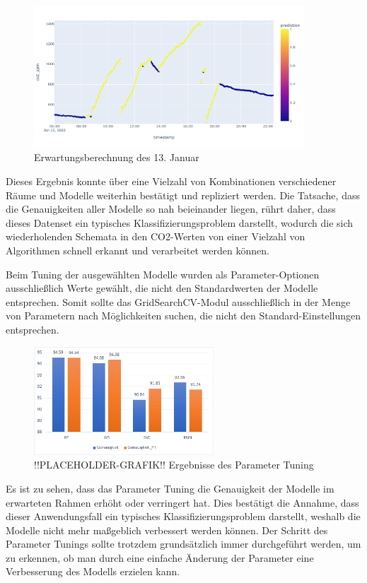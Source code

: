 \begin{figure}[h]
    \centering
    \includegraphics[width=0.9\textwidth]{pic/nov23_predicted.png}
    \caption{Erwartungsberechnung des 13. Januar}
    \label{fig:nov23_pred}
\end{figure}

Dieses Ergebnis konnte über eine Vielzahl von Kombinationen verschiedener Räume und Modelle weiterhin
bestätigt und repliziert werden. 
\newpage
Die Tatsache, dass die Genauigkeiten aller Modelle so nah beieinander 
liegen, rührt daher, dass dieses Datenset ein typisches Klassifizierungsproblem darstellt,
wodurch die sich wiederholenden Schemata in den CO2-Werten von einer Vielzahl von Algorithmen schnell 
erkannt und verarbeitet werden können.

Beim Tuning der ausgewählten Modelle wurden als Parameter-Optionen ausschließlich Werte gewählt, die nicht 
den Standardwerten der Modelle entsprechen. Somit sollte das GridSearchCV-Modul ausschließlich in der Menge 
von Parametern nach Möglichkeiten suchen, die nicht den Standard-Einstellungen entsprechen.

\begin{figure}[h]
    \centering
    \includegraphics[width=0.6\textwidth]{pic/param_eval.png}
    \caption{!!PLACEHOLDER-GRAFIK!! Ergebnisse des Parameter Tuning}
    \label{fig:PT_eval}
\end{figure}

Es ist zu sehen, dass das Parameter Tuning die Genauigkeit der Modelle im erwarteten Rahmen erhöht oder 
verringert hat. Dies bestätigt die Annahme, dass dieser Anwendungsfall ein typisches Klassifizierungsproblem 
darstellt, weshalb die Modelle nicht mehr maßgeblich verbessert werden können. Der Schritt des Parameter Tunings 
sollte trotzdem grundsätzlich immer durchgeführt werden, um zu erkennen, ob man durch eine einfache Änderung 
der Parameter eine Verbesserung des Modells erzielen kann.\\


